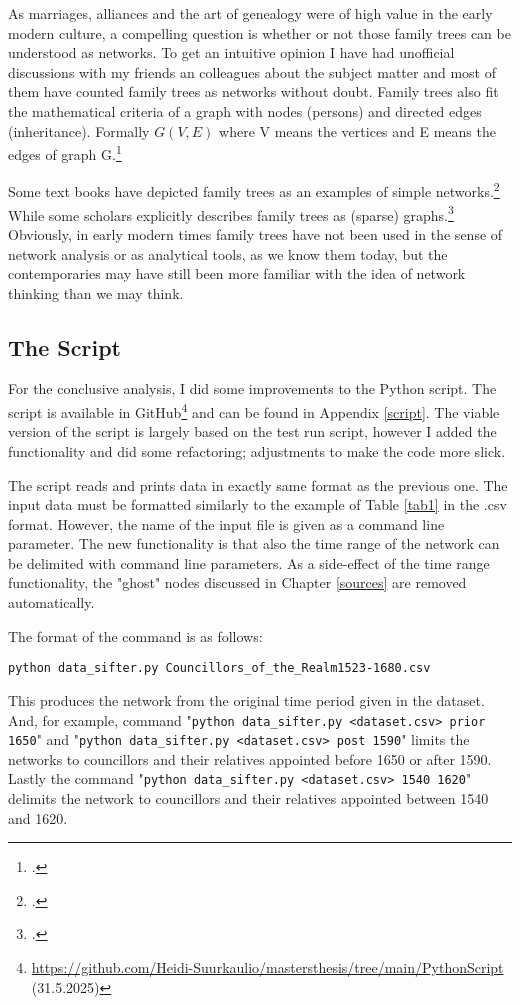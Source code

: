 As marriages, alliances and the art of genealogy were of high value in the early modern culture, a compelling question is whether or not those family trees can be understood as networks. To get an intuitive opinion I have had unofficial discussions with my friends an colleagues about the subject matter and most of them have counted family trees as networks without doubt. Family trees also fit the mathematical criteria of a graph with nodes (persons) and directed edges (inheritance). Formally $G(V,E)$ where V means the vertices and E means the edges of graph G.\footcite[p. vii]{RajPM2018a}

Some text books have depicted family trees as an examples of simple networks.\footcite[See e. g.][p. 247.]{huhtamakiEtAl} While some scholars explicitly describes family trees as (sparse) graphs.\footcite{batagelj} Obviously, in early modern times family trees have not been used in the sense of network analysis or as analytical tools, as we know them today, but the contemporaries may have still been more familiar with the idea of network thinking than we may think.

\subsection{The Script}
For the conclusive analysis, I did some improvements to the Python script. The script is available in GitHub\footnote{\url{https://github.com/Heidi-Suurkaulio/mastersthesis/tree/main/PythonScript} (31.5.2025)} and can be found in Appendix \ref{script}. The viable version of the script is largely based on the test run script, however I added the functionality and did some refactoring; adjustments to make the code more slick. 

The script reads and prints data in exactly same format as the previous one. The input data must be formatted similarly to the example of Table \ref{tab1} in the .csv format. However, the name of the input file is given as a command line parameter. The new functionality is that also the time range of the network can be delimited with command line parameters. As a side-effect of the time range functionality, the "ghost" nodes discussed in Chapter \ref{sources} are removed automatically.

The format of the command is as follows: 
\begin{verbatim}
python data_sifter.py Councillors_of_the_Realm1523-1680.csv
\end{verbatim}

This produces the network from the original time period given in the dataset. And, for example, command "\texttt{python data\_sifter.py <dataset.csv> prior 1650}" and "\texttt{python data\_sifter.py <dataset.csv> post 1590}" limits the networks to councillors and their relatives appointed before 1650 or after 1590. Lastly the command "\texttt{python data\_sifter.py <dataset.csv> 1540 1620}" delimits the network to councillors and their relatives appointed between 1540 and 1620.

